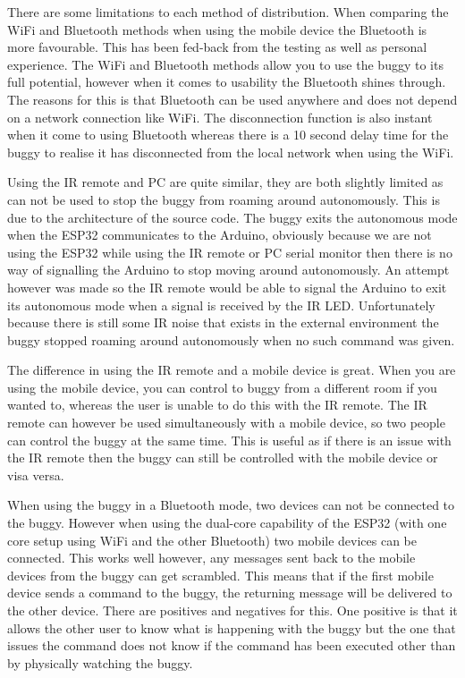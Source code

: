 \documentclass[8pt, a4paper]{article}
\begin{document}
There are some limitations to each method of distribution. When comparing the WiFi and Bluetooth methods when using the mobile device the Bluetooth is more favourable. This has been fed-back from the testing as well as personal experience. The WiFi and Bluetooth methods allow you to use the buggy to its full potential, however when it comes to usability the Bluetooth shines through. The reasons for this is that Bluetooth can be used anywhere and does not depend on a network connection like WiFi. The disconnection function is also instant when it come to using Bluetooth whereas there is a 10 second delay time for the buggy to realise it has disconnected from the local network when using the WiFi. 

Using the IR remote and PC are quite similar, they are both slightly limited as can not be used to stop the buggy from roaming around autonomously. This is due to the architecture of the source code. The buggy exits the autonomous mode when the ESP32 communicates to the Arduino, obviously because we are not using the ESP32 while using the IR remote or PC serial monitor then there is no way of signalling the Arduino to stop moving around autonomously. An attempt however was made so the IR remote would be able to signal the Arduino to exit its autonomous mode when a signal is received by the IR LED. Unfortunately because there is still some IR noise that exists in the external environment the buggy stopped roaming around autonomously when no such command was given. 

The difference in using the IR remote and a mobile device is great. When you are using the mobile device, you can control to buggy from a different room if you wanted to, whereas the user is unable to do this with the IR remote. The IR remote can however be used simultaneously with a mobile device, so two people can control the buggy at the same time. This is useful as if there is an issue with the IR remote then the buggy can still be controlled with the mobile device or visa versa. 

When using the buggy in a Bluetooth mode, two devices can not be connected to the buggy. However when using the dual-core capability of the ESP32 (with one core setup using WiFi and the other Bluetooth) two mobile devices can be connected. This works well however, any messages sent back to the mobile devices from the buggy can get scrambled. This means that if the first mobile device sends a command to the buggy, the returning message will be delivered to the other device. There are positives and negatives for this. One positive is that it allows the other user to know what is happening with the buggy but the one that issues the command does not know if the command has been executed other than by physically watching the buggy. 
\end{document}
